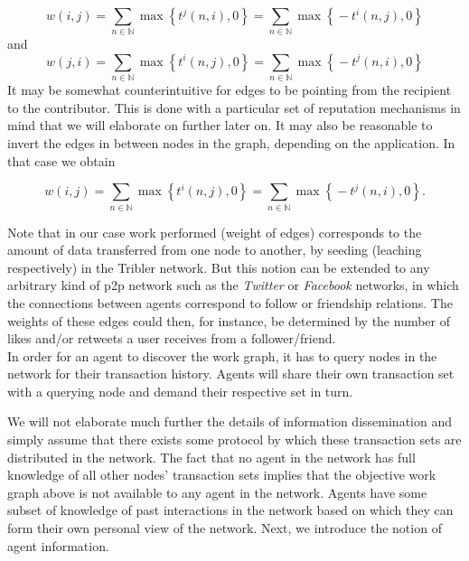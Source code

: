 \documentclass[11pt,a4paper]{article}
\theoremstyle{definition}
\theoremstyle{theorem}
\theoremstyle{proposition}
\theoremstyle{corollary}
\theoremstyle{lemma}
\theoremstyle{example}
\theoremstyle{remark}
\begin{document}
\[
w(i,j) = \sum\limits_{n\in\mathbb{N}}\max\left\lbrace{}t^j(n,i), 0 \right\rbrace = \sum\limits_{n\in\mathbb{N}}\max\left\lbrace{}-t^i(n,j),0\right\rbrace 
\]
\noindent{}and
\[
w(j,i) = \sum\limits_{n\in\mathbb{N}}\max\left\lbrace{}t^i(n,j), 0 \right\rbrace = \sum\limits_{n\in\mathbb{N}}\max\left\lbrace{}-t^j(n,i),0\right\rbrace
\]
\noindent{}It may be somewhat counterintuitive for edges to be pointing from the recipient to the contributor. This is done with a particular set of reputation mechanisms in mind that we will elaborate on further later on. It may also be reasonable to invert the edges in between nodes in the graph, depending on the application. In that case we obtain

\[
w(i,j) = \sum\limits_{n\in\mathbb{N}}\max\left\lbrace{}t^i(n,j), 0 \right\rbrace = \sum\limits_{n\in\mathbb{N}}\max\left\lbrace{}-t^j(n,i),0\right\rbrace.
\]

\noindent{}Note that in our case work performed (weight of edges) corresponds to the amount of data transferred from one node to another, by seeding (leaching respectively) in the Tribler network. But this notion can be extended to any arbitrary kind of p2p network such as the {\it Twitter} or {\it Facebook} networks, in which the connections between agents correspond to follow or friendship relations. The weights of these edges could then, for instance, be determined by the number of likes and/or retweets a user receives from a follower/friend. \vspace{1em}\\

\noindent{}In order for an agent to discover the work graph, it has to query nodes in the network for their transaction history. Agents will share their own transaction set with a querying node and demand their respective set in turn. 

\noindent{}We will not elaborate much further the details of information dissemination and simply assume that there exists some protocol by which these transaction sets are distributed in the network. The fact that no agent in the network has full knowledge of all other nodes' transaction sets implies that the objective work graph above is not available to any agent in the network. Agents have some subset of knowledge of past interactions in the network based on which they can form their own personal view of the network. Next, we introduce the notion of agent information.
\end{document}
